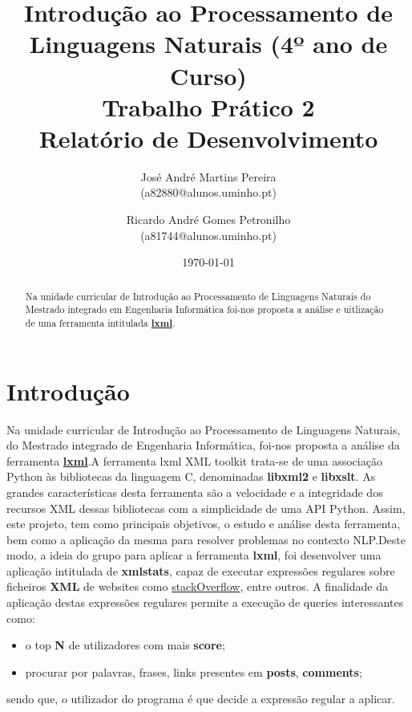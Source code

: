 \documentclass[11pt,a4paper]{report}%
\title{Introdução ao Processamento de Linguagens Naturais (4º ano de Curso)\\
       \textbf{Trabalho Prático 2}\\ Relatório de Desenvolvimento
       } %
\author{José André Martins Pereira\\ (a82880@alunos.uminho.pt) \and Ricardo André Gomes Petronilho\\ (a81744@alunos.uminho.pt)
       } %
\date{\today} %
\begin{document}
\maketitle %

\begin{abstract}  %
Na unidade curricular de Introdução ao Processamento de Linguagens Naturais do Mestrado integrado em Engenharia Informática foi-nos proposta a análise e uitlização de uma ferramenta intitulada \textbf{\href{https://lxml.de/index.html}{lxml}}.
\end{abstract}

\tableofcontents %

\chapter{Introdução} \label{chap:intro} %
Na unidade curricular de Introdução ao Processamento de Linguagens Naturais, do Mestrado integrado de Engenharia Informática, foi-nos proposta a análise da ferramenta \textbf{\href{https://lxml.de/index.html}{lxml}}.\newline A ferramenta lxml XML toolkit trata-se de uma associação Python às bibliotecas da linguagem C, denominadas \textbf{libxml2} e  \textbf{libxslt}. As grandes características desta ferramenta são a velocidade e a integridade dos recursos XML dessas bibliotecas com a simplicidade de uma API Python. \newline Assim, este projeto, tem como principais objetivos, o estudo e análise desta ferramenta, bem como a aplicação da mesma para resolver problemas no contexto  NLP.\newline Deste modo, a ideia do grupo para aplicar a ferramenta \textbf{lxml}, foi desenvolver uma aplicação intitulada de \textbf{xmlstats}, capaz de executar expressões regulares sobre ficheiros \textbf{XML} de websites como \href{https://pt.stackoverflow.com}{stackOverflow}, entre outros. A finalidade da aplicação destas expressões regulares permite a execução de queries interessantes como:
\begin{itemize}
    \item o top \textbf{N} de utilizadores com mais \textbf{score};
    \item procurar por palavras, frases, links presentes em \textbf{posts}, \textbf{comments};
\end{itemize}{}
sendo que, o utilizador do programa é que decide a expressão regular a aplicar.
\end{document}
